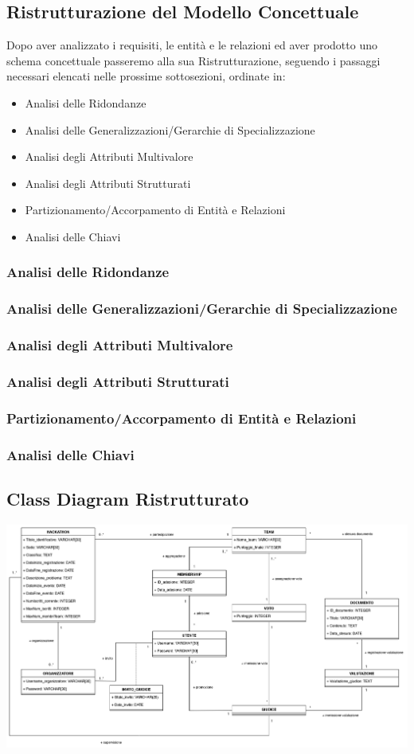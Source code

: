 \documentclass[a4paper, 10pt]{article}
\begin{document}
	\subsection{Ristrutturazione del Modello Concettuale}
	Dopo aver analizzato i requisiti, le entità e le relazioni ed aver prodotto uno schema concettuale passeremo alla sua Ristrutturazione, seguendo i passaggi necessari elencati nelle prossime sottosezioni, ordinate in:
	\begin{itemize}
		\item Analisi delle Ridondanze
		\item Analisi delle Generalizzazioni/Gerarchie di Specializzazione
		\item Analisi degli Attributi Multivalore
		\item Analisi degli Attributi Strutturati
		\item Partizionamento/Accorpamento di Entità e Relazioni
		\item Analisi delle Chiavi
	\end{itemize}
	\subsubsection{Analisi delle Ridondanze}
	\subsubsection{Analisi delle Generalizzazioni/Gerarchie di Specializzazione}
	\subsubsection{Analisi degli Attributi Multivalore}
	\subsubsection{Analisi degli Attributi Strutturati}
	\subsubsection{Partizionamento/Accorpamento di Entità e Relazioni}
	\subsubsection{Analisi delle Chiavi}
	\subsection{Class Diagram Ristrutturato}
	\includegraphics[width=1\textwidth]{../Immagini/Hackathon_UMLRistrutturato}
	\newpage
\end{document}
